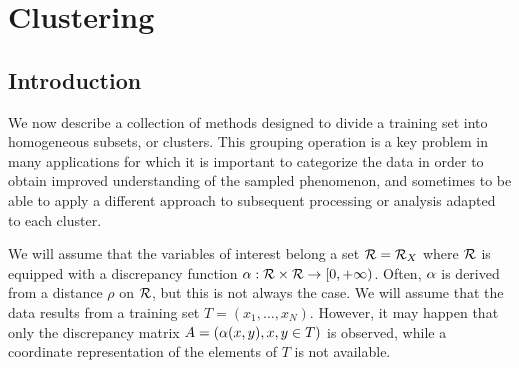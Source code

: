 
\chapter{Clustering}
\label{chap:clustering}
\label{sec:clustering}
\section{Introduction}
We now describe a collection of methods designed to divide a training set into homogeneous subsets, or clusters. This grouping operation is a key problem in many applications for which it is important to categorize the data in order to obtain improved understanding of the sampled phenomenon, and sometimes to be able to apply a different approach to subsequent processing or analysis adapted to each cluster. 

We will assume that the variables of interest belong a  set ${\mathcal R}= {\mathcal R}_X$ where ${\mathcal R}$ is equipped with a discrepancy function $\alpha: {\mathcal R}\times {\mathcal R} \to [0, +\infty)$. Often, $\alpha$ is derived from a distance $\rho$ on ${\mathcal R}$, but this is not always the case. We will assume that the data results from a  training set  $T = (x_1, \ldots, x_N)$. However, it may happen that 
only the discrepancy matrix $A = (\alpha(x, y), x,y\in T)$ is observed, while a coordinate representation of the elements of $T$ is not  available.
 
